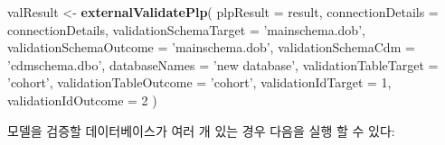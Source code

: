 \documentclass[10.5pt]{book}
\newenvironment{Shaded}{\begin{snugshade}}{\end{snugshade}}
\newcommand{\KeywordTok}[1]{\textcolor[rgb]{0.13,0.29,0.53}{\textbf{#1}}}
\newcommand{\DataTypeTok}[1]{\textcolor[rgb]{0.13,0.29,0.53}{#1}}
\newcommand{\DecValTok}[1]{\textcolor[rgb]{0.00,0.00,0.81}{#1}}
\newcommand{\StringTok}[1]{\textcolor[rgb]{0.31,0.60,0.02}{#1}}
\newcommand{\NormalTok}[1]{#1}
\theoremstyle{definition}
\theoremstyle{definition}
\theoremstyle{definition}
\theoremstyle{remark}
\begin{document}
\begin{Shaded}
\begin{Highlighting}[]
\NormalTok{valResult <-}\StringTok{ }\KeywordTok{externalValidatePlp}\NormalTok{(}
    \DataTypeTok{plpResult =}\NormalTok{ result,}
    \DataTypeTok{connectionDetails =}\NormalTok{ connectionDetails,}
    \DataTypeTok{validationSchemaTarget =} \StringTok{'mainschema.dob'}\NormalTok{,}
    \DataTypeTok{validationSchemaOutcome =} \StringTok{'mainschema.dob'}\NormalTok{,}
    \DataTypeTok{validationSchemaCdm =} \StringTok{'cdmschema.dbo'}\NormalTok{,}
    \DataTypeTok{databaseNames =} \StringTok{'new database'}\NormalTok{,}
    \DataTypeTok{validationTableTarget =} \StringTok{'cohort'}\NormalTok{,}
    \DataTypeTok{validationTableOutcome =} \StringTok{'cohort'}\NormalTok{,}
    \DataTypeTok{validationIdTarget =} \DecValTok{1}\NormalTok{,}
    \DataTypeTok{validationIdOutcome =} \DecValTok{2}
\NormalTok{)}
\end{Highlighting}
\end{Shaded}

모델을 검증할 데이터베이스가 여러 개 있는 경우 다음을 실행 할 수 있다:
\end{document}
